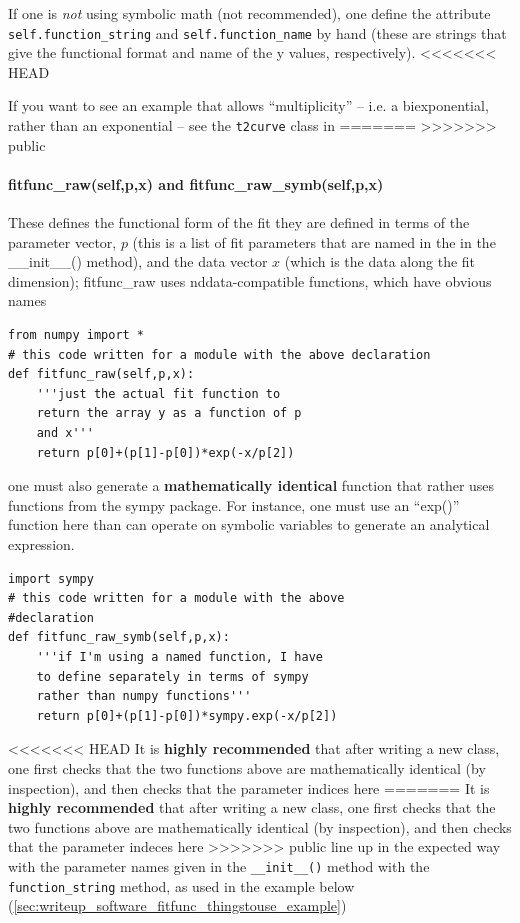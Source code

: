 If one is {\it not} using symbolic math (not recommended),
    one define the attribute {\tt self.function\_string} and {\tt self.function\_name}
    by hand (these are strings that give the functional format and name of the y values,
    respectively).
<<<<<<< HEAD

If you want to see an example that allows ``multiplicity'' -- i.e. a
    biexponential, rather than an exponential -- see the \texttt{t2curve} class
    in 
=======
>>>>>>> public
\paragraph{fitfunc\_raw(self,p,x) and fitfunc\_raw\_symb(self,p,x)}
These defines the functional form of the fit
    they are defined in terms of the parameter vector, $p$
    (this is a list of fit parameters that are named in
    the in the \_\_init\_\_() method),
    and the data vector $x$ (which is the data along
    the fit dimension);
fitfunc\_raw uses nddata-compatible functions, which have obvious names
\begin{lstlisting}
from numpy import *
# this code written for a module with the above declaration
def fitfunc_raw(self,p,x):
    '''just the actual fit function to
    return the array y as a function of p
    and x'''
    return p[0]+(p[1]-p[0])*exp(-x/p[2])
\end{lstlisting}
one must also generate a {\bf mathematically identical}
    function that rather uses functions from the sympy package.
For instance, one must use an ``exp()'' function here
    than can operate on symbolic variables to generate
    an analytical expression.
\begin{lstlisting}
import sympy
# this code written for a module with the above
#declaration
def fitfunc_raw_symb(self,p,x):
    '''if I'm using a named function, I have
    to define separately in terms of sympy
    rather than numpy functions'''
    return p[0]+(p[1]-p[0])*sympy.exp(-x/p[2])
\end{lstlisting}
<<<<<<< HEAD
It is {\bf highly recommended} that after writing a new class,
    one first checks that the two functions above are mathematically identical (by inspection),
    and then checks that the parameter indices here
=======
It is {\bf highly recommended} that after writing a new class,
    one first checks that the two functions above are mathematically identical (by inspection),
    and then checks that the parameter indeces here
>>>>>>> public
    line up in the expected way with the parameter
    names given in the {\tt \_\_init\_\_()} method
    with the {\tt function\_string} method, as used in the example
    below (\ref{sec:writeup_software_fitfunc_thingstouse_example})
